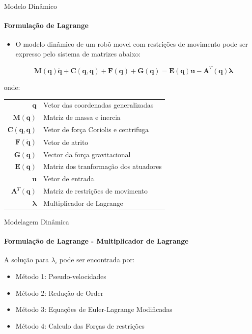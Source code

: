 \documentclass[aspectratio=169]{beamer}
\newcommand{\cmark}{\textcolor{green}{\ding{51}}}%
\newcommand{\xmark}{\textcolor{red}{\ding{55}}}%
\begin{document}
\begin{frame}{Modelo Dinâmico}
    \framesubtitle{Formulação de Lagrange}
    \begin{itemize}
        \item O modelo dinâmico de um robô movel com restrições de movimento pode ser expresso pelo sistema de matrizes abaixo:

              \begin{equation}
                  \mathbf{M(q)\ddot{q}+ C(q, \dot{q})+ F(\dot{q})+G(q) = E(q)u -A}^T\mathbf{(q)}\boldsymbol{\lambda}
              \end{equation}
    \end{itemize}

    \begin{block}{}
        \scriptsize{
            onde:
            \begin{tabular}{ r | l }
                $\mathbf{q}$               & Vetor das coordenadas generalizadas   \\
                $\mathbf{M(q)}$            & Matriz de massa e inercia             \\
                $\mathbf{C(q, \dot{q})}$   & Vetor de força Coriolis e centrifuga  \\
                $\mathbf{F(\dot{q})}$      & Vetor de atrito                       \\
                $\mathbf{G(q)}$            & Vector da força gravitacional         \\
                $\mathbf{E(q)}$            & Matriz dos tranformação dos atuadores \\
                $\mathbf{u}$               & Vetor de entrada                      \\
                $\mathbf{A}^T\mathbf{(q)}$ & Matriz de restrições de movimento     \\
                $\boldsymbol{\lambda}$     & Multiplicador de Lagrange             \\
            \end{tabular}}
    \end{block}
\end{frame}



\begin{frame}{Modelagem Dinâmica}
    \framesubtitle{Formulação de Lagrange - Multiplicador de Lagrange}
    A solução para $\lambda_i$ pode ser encontrada por:
    \begin{itemize}
        \item Método 1: Pseudo-velocidades \cmark
        \item Método 2: Redução de Order \xmark
        \item Método 3: Equações de Euler-Lagrange Modificadas \xmark
        \item Método 4: Calculo das Forças de restrições \xmark
    \end{itemize}
\end{frame}
\end{document}
